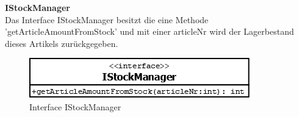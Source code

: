 \textbf{IStockManager}\\
Das Interface IStockManager besitzt die eine Methode 'getArticleAmountFromStock' und mit einer articleNr wird der Lagerbestand dieses Artikels zurückgegeben.
\begin{figure}[H]
	\includegraphics[width=0.5\linewidth]{Images/IStockManager}
	\caption{Interface IStockManager}
	\label{fig:if-IStockManager}
\end{figure}
